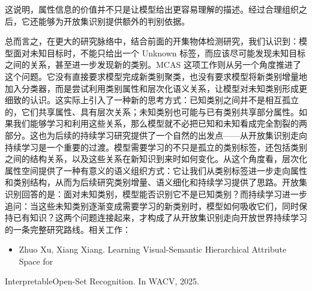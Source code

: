 这说明，属性信息的价值并不只是让模型给出更容易理解的描述。经过合理组织之后，它还能够为开放集识别提供额外的判别依据。

总而言之，在更大的研究脉络中，结合前面的开集物体检测研究，我们认识到：模型面对未知目标时，不能只给出一个 Unknown 标签，而应该尽可能发现未知目标之间的关系，甚至进一步发现新的类别。MCAS 这项工作则从另一个角度推进了这个问题。它没有直接要求模型完成新类别聚类，也没有要求模型将新类别增量地加入分类器，而是尝试利用类别属性和层次化语义关系，让模型对未知类别形成更细致的认识。这实际上引入了一种新的思考方式：已知类别之间并不是相互孤立的，它们共享属性、具有层次关系；未知类别也可能与已有类别共享部分属性。如果我们能够学习和利用这些关系，那么模型就不必把已知和未知看成完全割裂的两部分。这也为后续的持续学习研究提供了一个自然的出发点——从开放集识别走向持续学习是一个重要的过渡。模型需要学习的不只是孤立的类别标签，还包括类别之间的结构关系，以及这些关系在新知识到来时如何变化。从这个角度看，层次化属性空间提供了一种有意义的语义组织方式：它让我们从类别标签进一步走向属性和类别结构，从而为后续研究类别增量、语义细化和持续学习提供了思路。开放集识别回答的是：面对未知类别，模型能否识别它不是已知类别？而持续学习进一步追问：当这些未知类别逐渐变成需要学习的新类别时，模型如何吸收它们，同时保持已有知识？这两个问题连接起来，才构成了从开放集识别走向开放世界持续学习的一条完整研究路线。相关工作：

\begin{itemize}
  \item Zhuo Xu, Xiang Xiang. Learning Visual-Semantic Hierarchical Attribute Space for
\end{itemize}

InterpretableOpen-Set Recognition. In WACV, 2025.
